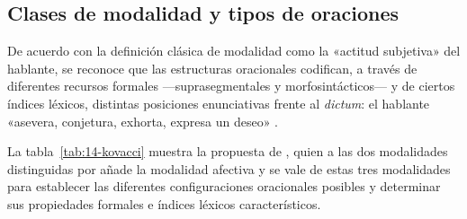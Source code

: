 \subsection{Clases de modalidad y tipos de oraciones}\label{sec:14-clases}

De acuerdo con la definición clásica de modalidad como la «actitud subjetiva» del
hablante, se reconoce que las estructuras oracionales codifican, a través de
diferentes recursos formales ---suprasegmentales y morfosintácticos--- y de
ciertos índices léxicos, distintas posiciones enunciativas frente al
\textit{dictum}: el hablante «asevera, conjetura, exhorta, expresa un deseo»
\parencite[98]{kovacci1992}.

La tabla~\ref{tab:14-kovacci} muestra la propuesta de \textcite{kovacci1992},
quien a las dos modalidades distinguidas por \textcite{palmer1986} añade la
modalidad afectiva y se vale de estas tres modalidades para establecer las
diferentes configuraciones oracionales posibles y determinar sus propiedades
formales e índices léxicos característicos.

